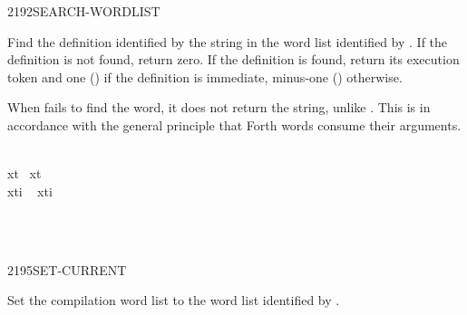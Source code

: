 \enlargethispage{4ex}
\begin{worddef}{2192}{SEARCH-WORDLIST}
\item {}

	Find the definition identified by the string  in
	the word list identified by . If the definition is not
	found, return zero. If the definition is found, return its
	execution token  and one () if the definition is
	immediate, minus-one () otherwise.

	\begin{rationale} %
		When  fails to find the word, it does
		not return the string, unlike . This is in
		accordance with the general principle that Forth words consume
		their arguments.
	\end{rationale}

	\begin{testing} %
		\ttfamily
		   \\
		 xt~   xt~ \word{!} \\
		 xti  ~ xti \word{!}  

		 \\
		 \\
	\end{testing}
\end{worddef}


\begin{worddef}{2195}{SET-CURRENT}
\item {}

	Set the compilation word list to the word list identified by
	.

	\begin{testing} %

		 \\
		 \\

	\end{testing}
\end{worddef}


